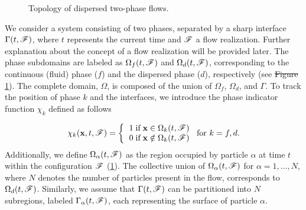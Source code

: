 \documentclass[11pt]{My_preprint}
\providecommand{\DIFdel}[1]{{\protect\color{red}\sout{#1}}}                      %
\providecommand{\DIFdelbegin}{} %
\providecommand{\DIFdelend}{} %
\begin{document}
\begin{figure}[h!]
    \centering
    \caption{Topology of dispersed two-phase flows.}\label{fig:Scheme}
\end{figure}

We consider a system consisting of two phases, separated by a sharp interface $\Gamma(t,\mathscr{F})$,
where $t$ represents the current time and $\mathscr{F}$ a flow realization. Further explanation about the concept of a flow realization will be provided later. 
The phase subdomains are labeled as $\Omega_f(t,\mathscr{F})$ and $\Omega_d(t,\mathscr{F})$, corresponding to the continuous (fluid) phase ($f$) and the dispersed phase ($d$), respectively (see \DIFdelbegin \DIFdel{Figure }\DIFdelend \ref{fig:Scheme}). 
The complete domain, $\Omega$, is composed of the union of $\Omega_f$, $\Omega_d$, and $\Gamma$. To track the position of phase $k$ and the interfaces, we introduce the phase indicator function $\chi_k$ defined as follows

\begin{align}
    \chi_k(\textbf{x},t,\FF) =  \left\{
      \begin{tabular}{cc}
        $1 \;\text{if} \;\textbf{x} \in \Omega_k(t,\FF)$\\
        $0 \;\text{if} \;\textbf{x} \notin \Omega_k(t,\FF)$
      \end{tabular}
      \right.
      \text{for $k = f,d$}.
      \label{eq:PIF}
\end{align}
Additionally, we define $\Omega_\alpha(t, \mathscr{F})$ as the region occupied by particle $\alpha$ at time $t$ within the configuration $\mathscr{F}$ (\ref{fig:Scheme}). The collective union of $\Omega_\alpha(t, \mathscr{F})$ for $\alpha = 1, \ldots, N$, where $N$ denotes the number of particles present in the flow, corresponds to $\Omega_d(t, \mathscr{F})$. Similarly, we assume that $\Gamma(t, \mathscr{F})$ can be partitioned into $N$ subregions, labeled $\Gamma_\alpha(t, \mathscr{F})$, each representing the surface of particle $\alpha$.
\end{document}

